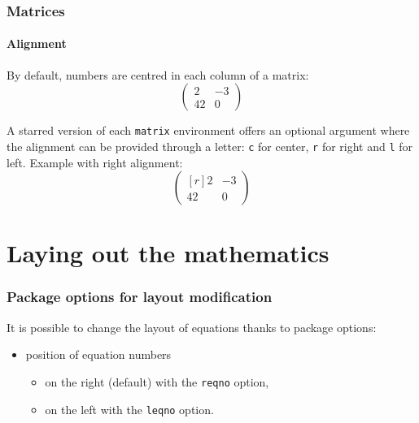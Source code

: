 \documentclass[11pt]{beamer}
\begin{document}
\begin{frame}
	\frametitle{Matrices}
	\framesubtitle{Alignment}
	
	By default, numbers are centred in each column of a matrix:
	\begin{equation*}
		\begin{pmatrix}
			2  & -3 \\
			42 & 0
		\end{pmatrix}
	\end{equation*}
	
	A starred version of each \texttt{matrix} environment offers an optional argument where the alignment can be provided through a letter: \texttt{c} for center, \texttt{r} for right and \texttt{l} for left.
	Example with right alignment:
	\begin{equation*}
		\begin{pmatrix*}[r]
			2  & -3 \\
			42 & 0
		\end{pmatrix*}
	\end{equation*}
\end{frame}


\section{Laying out the mathematics}

\begin{frame}
	\frametitle{Package options for layout modification}

	It is possible to change the layout of equations thanks to package options:
	\begin{itemize}
		\item position of equation numbers
		\begin{itemize}
			\item on the right (default) with the \texttt{reqno} option,
			\item on the left with the \texttt{leqno} option.
		\end{itemize}
	\end{itemize}
\end{frame}


\end{document}
